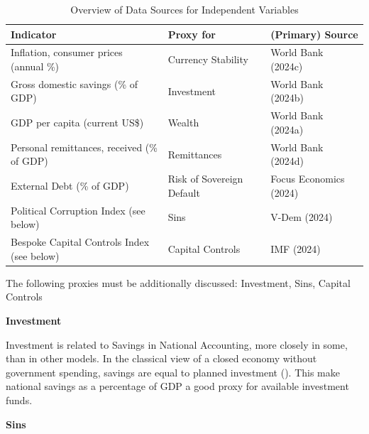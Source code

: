 \documentclass[
]{article}
\begin{document}
\begin{table}[!h]
\centering
\caption{\label{tab:datatbl}Overview of Data Sources for Independent Variables \label{tab:datatable}}
\centering
\begin{tabular}[t]{l|l|l}
\hline
Indicator & Proxy for & (Primary) Source\\
\hline
Inflation, consumer prices (annual \%) & Currency Stability & World Bank (2024c)\\
\hline
Gross domestic savings (\% of GDP) & Investment & World Bank (2024b)\\
\hline
GDP per capita (current US\$) & Wealth & World Bank (2024a)\\
\hline
Personal remittances, received (\% of GDP) & Remittances & World Bank (2024d)\\
\hline
External Debt (\% of GDP) & Risk of Sovereign Default & Focus Economics (2024)\\
\hline
Political Corruption Index (see below) & Sins & V-Dem (2024)\\
\hline
Bespoke Capital Controls Index (see below) & Capital Controls & IMF (2024)\\
\hline
\end{tabular}
\end{table}

The following proxies must be additionally discussed: Investment, Sins, Capital Controls

\textbf{Investment}

Investment is related to Savings in National Accounting, more closely in some, than in other models. In the classical view of a closed economy without government spending, savings are equal to planned investment (). This make national savings as a percentage of GDP a good proxy for available investment funds.

\textbf{Sins}
\end{document}
